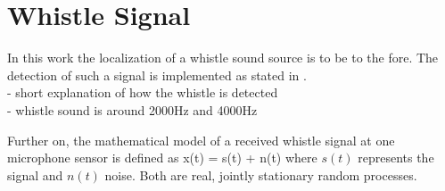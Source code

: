 \section{Whistle Signal}
\label{sec:02_whistleSignal}

In this work the localization of a whistle sound source is to be to the fore.
The detection of such a signal is implemented as stated in \cite{Hasselbring}.\\
- short explanation of how the whistle is detected\\
- whistle sound is around 2000Hz and 4000Hz

Further on, the mathematical model of a received whistle signal at one microphone sensor
is defined as
\be
x(t) = s(t) + n(t)
\label{eq:02_whistleSignal}
\ee
where $s(t)$ represents the signal and $n(t)$ noise.
Both are real, jointly stationary random processes.